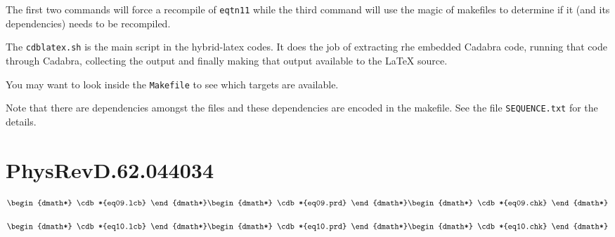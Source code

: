\documentclass[12pt]{cdblatex}
\begin{document}
The first two commands will force a recompile of {\tt eqtn11} while the third command
will use the magic of makefiles to determine if it (and its dependencies) needs to be
recompiled.

The {\tt cdblatex.sh} is the main script in the hybrid-latex codes. It does the job of
extracting rhe embedded Cadabra code, running that code through Cadabra, collecting
the output and finally making that output available to the LaTeX source.

You may want to look inside the {\tt Makefile} to see which targets are available.

Note that there are dependencies amongst the files and these dependencies are encoded
in the makefile. See the file {\tt SEQUENCE.txt} for the details.

\clearpage

\section*{PhysRevD.62.044034}


   \begin{dgroup*}
      \begin{dmath*} \cdb*{eq09.lcb} \end{dmath*}
      \begin{dmath*} \cdb*{eq09.prd} \end{dmath*}
      \begin{dmath*} \cdb*{eq09.chk} \end{dmath*}
   \end{dgroup*}


   \begin{dgroup*}
      \begin{dmath*} \cdb*{eq10.lcb} \end{dmath*}
      \begin{dmath*} \cdb*{eq10.prd} \end{dmath*}
      \begin{dmath*} \cdb*{eq10.chk} \end{dmath*}
   \end{dgroup*}

\end{document}
